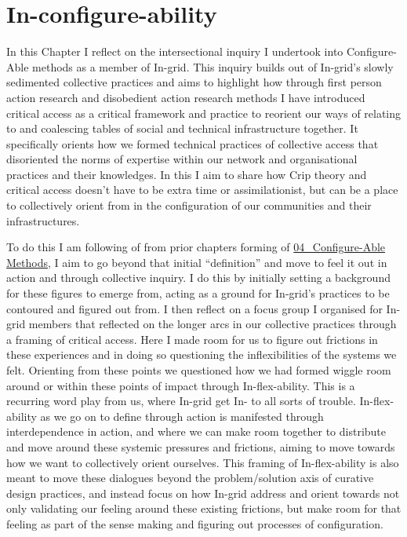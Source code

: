 \hypertarget{in-configure-ability}{%
\section[In-configure-ability]{\texorpdfstring{\protect\hypertarget{anchor}{}{}In-configure-ability}{In-configure-ability}}\label{in-configure-ability}}

In this Chapter I reflect on the intersectional inquiry I undertook into
Configure-Able methods as a member of In-grid. This inquiry builds out
of In-grid's slowly sedimented collective practices and aims to
highlight how through first person action research and disobedient
action research methods I have introduced critical access as a critical
framework and practice to reorient our ways of relating to and
coalescing tables of social and technical infrastructure together. It
specifically orients how we formed technical practices of collective
access that disoriented the norms of expertise within our network and
organisational practices and their knowledges. In this I aim to share
how Crip theory and critical access doesn't have to be extra time or
assimilationist, but can be a place to collectively orient from in the
configuration of our communities and their infrastructures.

To do this I am following of from prior chapters forming of
\href{../../04_Configure-able_Methods/04_Configure-Able\%20Methods.md}{04\_Configure-Able
Methods}, I aim to go beyond that initial ``definition'' and move to
feel it out in action and through collective inquiry. I do this by
initially setting a background for these figures to emerge from, acting
as a ground for In-grid's practices to be contoured and figured out
from. I then reflect on a focus group I organised for In-grid members
that reflected on the longer arcs in our collective practices through a
framing of critical access. Here I made room for us to figure out
frictions in these experiences and in doing so questioning the
inflexibilities of the systems we felt. Orienting from these points we
questioned how we had formed wiggle room around or within these points
of impact through In-flex-ability. This is a recurring word play from
us, where In-grid get In- to all sorts of trouble. In-flex-ability as we
go on to define through action is manifested through interdependence in
action, and where we can make room together to distribute and move
around these systemic pressures and frictions, aiming to move towards
how we want to collectively orient ourselves. This framing of
In-flex-ability is also meant to move these dialogues beyond the
problem/solution axis of curative design practices, and instead focus on
how In-grid address and orient towards not only validating our feeling
around these existing frictions, but make room for that feeling as part
of the sense making and figuring out processes of configuration.


